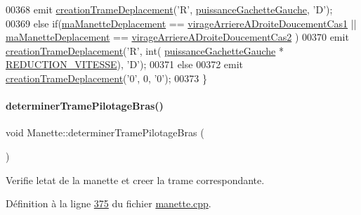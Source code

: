\begin{DoxyCode}
00368         emit \hyperlink{class_manette_a4151ee98538d58d2dde6c8027e9ef512}{creationTrameDeplacement}(\textcolor{charliteral}{'R'}, 
      \hyperlink{class_manette_ab777328c9b35454ab45ed5e0b0a5f234}{puissanceGachetteGauche}, \textcolor{charliteral}{'D'});
00369     \textcolor{keywordflow}{else} \textcolor{keywordflow}{if}(\hyperlink{class_manette_af3d0f304c4c33e02bdf34fc99aa4dbff}{maManetteDeplacement} == 
      \hyperlink{class_manette_a2dddb8a8a6f75abc15ddf58025b98ecc}{virageArriereADroiteDoucementCas1} || 
      \hyperlink{class_manette_af3d0f304c4c33e02bdf34fc99aa4dbff}{maManetteDeplacement} == \hyperlink{class_manette_a609f10f48e39eafac800eb232272f0cb}{virageArriereADroiteDoucementCas2}
      )
00370         emit \hyperlink{class_manette_a4151ee98538d58d2dde6c8027e9ef512}{creationTrameDeplacement}(\textcolor{charliteral}{'R'}, \textcolor{keywordtype}{int}(
      \hyperlink{class_manette_ab777328c9b35454ab45ed5e0b0a5f234}{puissanceGachetteGauche} * \hyperlink{manette_8h_a26e43ead1d984ddabb462b55010d12f6}{REDUCTION\_VITESSE}), \textcolor{charliteral}{'D'});
00371     \textcolor{keywordflow}{else}
00372         emit \hyperlink{class_manette_a4151ee98538d58d2dde6c8027e9ef512}{creationTrameDeplacement}(\textcolor{charliteral}{'0'}, 0, \textcolor{charliteral}{'0'});
00373 \}
\end{DoxyCode}
\mbox{\label{class_manette_ab5eb6972f366aa7527b2b27da5539638}} 
\paragraph{\texorpdfstring{determiner\+Trame\+Pilotage\+Bras()}{determinerTramePilotageBras()}}
{\footnotesize\ttfamily void Manette\+::determiner\+Trame\+Pilotage\+Bras (\begin{DoxyParamCaption}{ }\end{DoxyParamCaption})}



Verifie l\textquotesingle{}etat de la manette et creer la trame correspondante. 



Définition à la ligne \hyperlink{manette_8cpp_source_l00375}{375} du fichier \hyperlink{manette_8cpp_source}{manette.\+cpp}.



